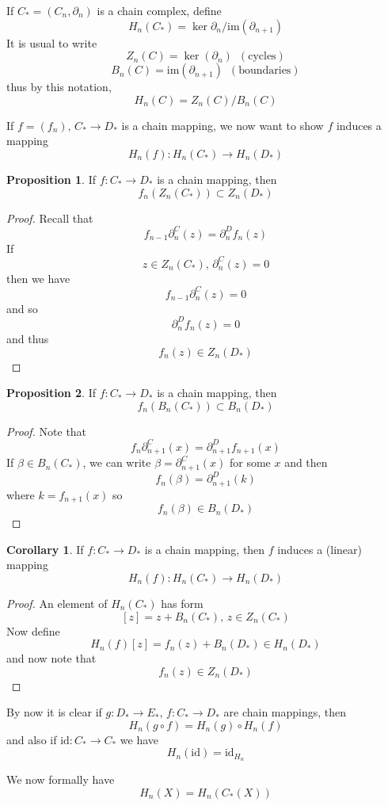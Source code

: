 \documentclass[a4paper,14pt]{extarticle}
\theoremstyle{definition}
\newtheorem*{corollary}{Corollary}
\newtheorem*{proposition}{Proposition}
\begin{document}
If $C_*=(C_n,\partial_n)$ is a chain complex, define \[H_n(C_*)=\ker\partial_n/\text{im}(\partial_{n+1})\]
It is usual to write \[Z_n(C)=\ker(\partial_n)\,\,\,(\text{cycles})\] \[B_n(C)=\text{im}(\partial_{n+1})\,\,\,(\text{boundaries})\]
thus by this notation, \[H_n(C)=Z_n(C)/B_n(C)\]

If $f=(f_n),\,C_*\rightarrow D_*$ is a chain mapping, we now want to show $f$ induces a mapping
\[H_n(f):H_n(C_*)\rightarrow H_n(D_*)\]

\begin{proposition}
	If $f:C_*\rightarrow D_*$ is a chain mapping, then \[f_n(Z_n(C_*))\subset Z_n(D_*)\]
\end{proposition}

\begin{proof}
	Recall that \[f_{n-1}\partial_n^C(z)=\partial_n^D f_n(z)\] If \[z\in Z_n(C_*),\,\partial_n^C(z)=0\] then we have \[f_{n-1}\partial_n^C(z)=0\] and so
	\[\partial_n^D f_n(z)=0\] and thus \[f_n(z)\in Z_n(D_*)\]
\end{proof}

\begin{proposition}
	If $f:C_*\rightarrow D_*$ is a chain mapping, then \[f_n(B_n(C_*))\subset B_n(D_*)\]
\end{proposition}

\begin{proof}
	Note that \[f_n\partial_{n+1}^C(x)=\partial_{n+1}^D f_{n+1}(x)\] If $\beta\in B_n(C_*)$, we can write $\beta=\partial_{n+1}^C(x)$ for some $x$ and then
	\[f_n(\beta)=\partial_{n+1}^D(k)\] where $k=f_{n+1}(x)$ so \[f_n(\beta)\in B_n(D_*)\]
\end{proof}

\begin{corollary}
	If $f:C_*\rightarrow D_*$ is a chain mapping, then $f$ induces a (linear) mapping \[H_n(f):H_n(C_*)\rightarrow H_n(D_*)\]
\end{corollary}

\begin{proof}
	An element of $H_n(C_*)$ has form \[[z]=z+B_n(C_*), \,z\in Z_n(C_*)\] Now define \[H_n(f)[z]=f_n(z)+B_n(D_*)\in H_n(D_*)\] and now note that \[f_n(z)\in Z_n(D_*)\]
\end{proof}

By now it is clear if $g:D_*\rightarrow E_*, \,f:C_*\rightarrow D_*$ are chain mappings, then \[H_n(g\circ f)=H_n(g)\circ H_n(f)\] and also if $\text{id}:C_*\rightarrow C_*$ we have
\[H_n(\text{id})=\text{id}_{H_n}\]

We now formally have \[H_n(X)=H_n(C_*(X))\]
\end{document}
